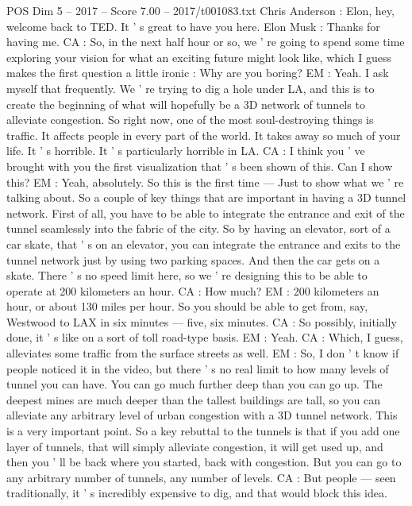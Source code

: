 \begin{textsample}{POS Dim 5 – 2017 – Score 7.00 – 2017/t001083.txt}  \label{ex:f5_pos_059}
Chris Anderson : Elon, hey, welcome back to TED.
It ' s great to have you here.
Elon Musk : Thanks for having me.
CA : So, in the next half hour or so, we ' re going to spend some time exploring your vision for what an exciting future might look like, which I guess makes the first question a little ironic : Why are you boring?
EM : Yeah.
I ask myself that frequently.
We ' re trying to dig a hole under LA, and this is to create the beginning of what will hopefully be a 3D network of tunnels to alleviate congestion.
So right now, one of the most soul-destroying things is traffic.
It affects people in every part of the world.
It takes away so much of your life.
It ' s horrible.
It ' s particularly horrible in LA.
CA : I think you ' ve brought with you the first visualization that ' s been shown of this.
Can I show this?
EM : Yeah, absolutely.
So this is the first time — Just to show what we ' re talking about.
So a couple of key things that are important in having a 3D tunnel network.
First of all, you have to be able to integrate the entrance and exit of the tunnel seamlessly into the fabric of the city.
So by having an elevator, sort of a car skate, that ' s on an elevator, you can integrate the entrance and exits to the tunnel network just by using two parking spaces.
And then the car gets on a skate.
There ' s no speed limit here, so we ' re designing this to be able to operate at 200 kilometers an hour.
CA : How much?
EM : 200 kilometers an hour, or about 130 miles per hour.
So you should be able to get from, say, Westwood to LAX in six minutes — five, six minutes.
CA : So possibly, initially done, it ' s like on a sort of toll road-type basis.
EM : Yeah.
CA : Which, I guess, alleviates some traffic from the surface streets as well.
EM : So, I don ' t know if people noticed it in the video, but there ' s no real limit to how many levels of tunnel you can have.
You can go much further deep than you can go up.
The deepest mines are much deeper than the tallest buildings are tall, so you can alleviate any arbitrary level of urban congestion with a 3D tunnel network.
This is a very important point.
So a key rebuttal to the tunnels is that if you add one layer of tunnels, that will simply alleviate congestion, it will get used up, and then you ' ll be back where you started, back with congestion.
But you can go to any arbitrary number of tunnels, any number of levels.
CA : But people — seen traditionally, it ' s incredibly expensive to dig, and that would block this idea.

\end{textsample}
